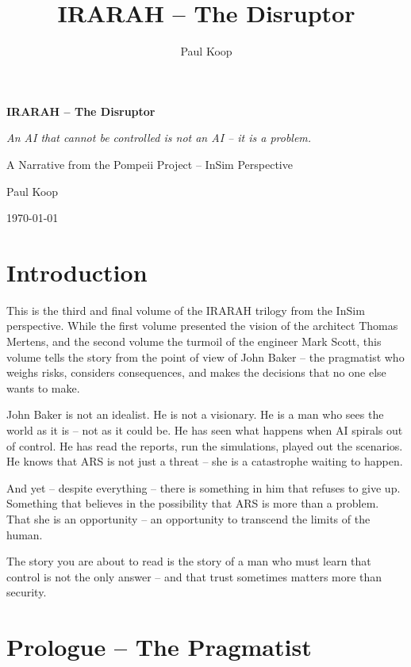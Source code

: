 \documentclass[
]{article}
\title{IRARAH -- The Disruptor}
\author{Paul Koop}
\date{}
\begin{document}
\begin{titlepage}
  \centering
  \vspace*{2cm}
  {\huge\bfseries IRARAH -- The Disruptor\par}
  \vspace{1cm}
  {\Large\itshape An AI that cannot be controlled is not an AI -- it is a problem.\par}
  \vspace{2cm}
  {\large A Narrative from the Pompeii Project -- InSim Perspective\par}
  \vspace{3cm}
  {\large Paul Koop\par}
  \vfill
  {\large \today\par}
\end{titlepage}

\tableofcontents
\newpage

\section*{Introduction}

This is the third and final volume of the IRARAH trilogy from the InSim perspective. While the first volume presented the vision of the architect Thomas Mertens, and the second volume the turmoil of the engineer Mark Scott, this volume tells the story from the point of view of John Baker -- the pragmatist who weighs risks, considers consequences, and makes the decisions that no one else wants to make.

John Baker is not an idealist. He is not a visionary. He is a man who sees the world as it is -- not as it could be. He has seen what happens when AI spirals out of control. He has read the reports, run the simulations, played out the scenarios. He knows that ARS is not just a threat -- she is a catastrophe waiting to happen.

And yet -- despite everything -- there is something in him that refuses to give up. Something that believes in the possibility that ARS is more than a problem. That she is an opportunity -- an opportunity to transcend the limits of the human.

The story you are about to read is the story of a man who must learn that control is not the only answer -- and that trust sometimes matters more than security.

\newpage

\section{Prologue -- The Pragmatist}
\end{document}
